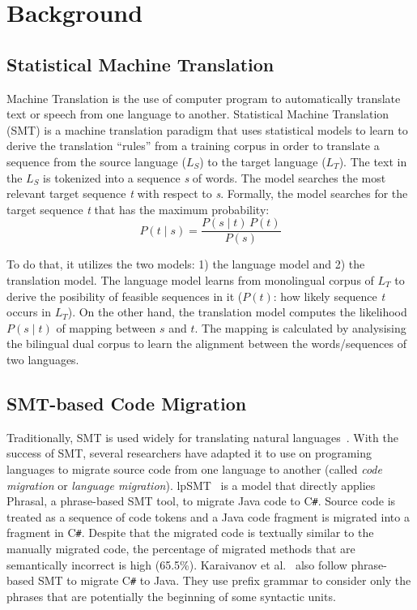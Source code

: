 \section{Background}
\label{sec:background}

\subsection{Statistical Machine Translation}

Machine Translation is the use of computer program to automatically
translate text or speech from one language to another. Statistical
Machine Translation (SMT) is a machine translation paradigm that uses
statistical models to learn to derive the translation ``rules'' from a
training corpus in order to translate a sequence from the source
language ($L_S$) to the target language ($L_T$). The text in the $L_S$
is tokenized into a sequence \textit{s} of words. The model searches
the most relevant target sequence \textit{t} with respect to
\textit{s}. Formally, the model searches for the target sequence
\textit{t} that has the maximum probability:
$$ P\left(t \mid s \right) = \frac{P\left(s \mid t\right) \, P\left(t\right)}{P\left(s\right)} $$

To do that, it utilizes the two models: 1) the language model and 2)
the translation model. The language model learns from monolingual
corpus of $L_T$ to derive the posibility of feasible sequences in it
($P\left(t\right)$: how likely sequence \textit{t} occurs in
$L_T$). On the other hand, the translation model computes the
likelihood $P\left(s \mid t\right)$ of mapping between $s$ and
$t$. The mapping is calculated by analysising the bilingual dual
corpus to learn the alignment between the words/sequences of two
languages.

\subsection{SMT-based Code Migration}

Traditionally, SMT is used widely for translating natural
languages~\cite{smtbook}. With the success of SMT, several researchers
have adapted it to use on programing languages to migrate source code
from one language to another (called {\em code migration} or {\em
  language migration}). lpSMT~\cite{fse13-nier} is a model that
directly applies Phrasal, a phrase-based SMT tool, to migrate Java
code to C\texttt{\#}. Source code is treated as a sequence of code
tokens and a Java code fragment is migrated into a fragment in
C\texttt{\#}. Despite that the migrated code is textually similar to
the manually migrated code, the percentage of migrated methods that
are semantically incorrect is high (65.5\%). 
%
Karaivanov et al.~\cite{karaivanov14} also follow phrase-based SMT to
migrate C\texttt{\#} to Java. They use prefix grammar to consider only
the phrases that are potentially the beginning of some syntactic
units.

